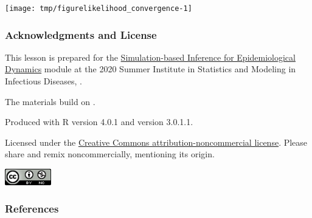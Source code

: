 \begin{frame}[fragile]

\begin{knitrout}\small
{}\color{fgcolor}\begin{kframe}
\begin{alltt}
 \hlkwb{<-} 
  \hlstd{(m3[r3}\hlopt{$}\hlopt{>}\hlopt{$}\hlopt{-}\hlstd{],}\hlstd{))}
\hlstd{=}\hlstd{,}\hlstd{=}\hlstd{,}
  \hlstd{=}\hlopt{+}\hlstd{(}\hlopt{-}\hlstd{,}\hlstd{))}
\end{alltt}
\end{kframe}

{\centering \texttt{[image: tmp/figurelikelihood\_convergence-1]} 

}



\end{knitrout}



\end{frame}  


\begin{frame}[fragile]
\frametitle{Acknowledgments and License}

\bi
\item This lesson is prepared for the \href{https://kingaa.github.io/sbied/}{Simulation-based Inference for Epidemiological Dynamics} module at the 2020 Summer Institute in Statistics and Modeling in Infectious Diseases, \href{https://www.biostat.washington.edu/suminst/sismid}{}.

\item The materials build on \href{https://kingaa.github.io/sbied/acknowledge.html}{}.

\item Produced with R version 4.0.1 and  version 3.0.1.1.

\item
Licensed under the \href{http://creativecommons.org/licenses/by-nc/3.0/}{Creative Commons attribution-noncommercial license}.
Please share and remix noncommercially, mentioning its origin.

\includegraphics[width=2cm]{../graphics/cc-by-nc.png}
\ei

\end{frame}


\begin{frame}[allowframebreaks]
\frametitle{References}

\end{frame}



